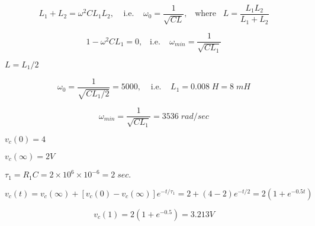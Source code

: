 {\newpage\clearpage
{}%
\begin{displaymath}	L_1+L_2=\omega^2CL_1L_2,\;\;\;\;\mbox{i.e.}\;\;\;\;
  	\omega_0=\frac{1}{\sqrt{CL}},\;\;\;\mbox{where}\;\;\;
  	L=\frac{L_1L_2}{L_1+L_2}
  \end{displaymath}%
\lthtmldisplayZ
\lthtmlcheckvsize\clearpage}

{\newpage\clearpage
{}%
\begin{displaymath}	1-\omega^2CL_1=0, \;\;\;\mbox{i.e.}\;\;\;\;
  	\omega_{min}=\frac{1}{\sqrt{CL_1}}	\end{displaymath}%
\lthtmldisplayZ
\lthtmlcheckvsize\clearpage}

{\newpage\clearpage
{}%
$L=L_1/2$%
\lthtmlinlinemathZ
\lthtmlcheckvsize\clearpage}

{\newpage\clearpage
{}%
\begin{displaymath} \omega_0=\frac{1}{\sqrt{CL_1/2}}=5000,\;\;\;\;\mbox{i.e.}\;\;\;\;
  	L_1=0.008\;H=8\;mH	\end{displaymath}%
\lthtmldisplayZ
\lthtmlcheckvsize\clearpage}

{\newpage\clearpage
{}%
\begin{displaymath} \omega_{min}=\frac{1}{\sqrt{CL_1}}=3536\;rad/sec	\end{displaymath}%
\lthtmldisplayZ
\lthtmlcheckvsize\clearpage}

{\newpage\clearpage
{}%
$v_c(0)=4$%
\lthtmlinlinemathZ
\lthtmlcheckvsize\clearpage}

{\newpage\clearpage
{}%
$v_c(\infty)=2V$%
\lthtmlinlinemathZ
\lthtmlcheckvsize\clearpage}

{\newpage\clearpage
{}%
$\tau_1=R_1C=2\times 10^6\times 10^{-6}=2\;sec.$%
\lthtmlinlinemathZ
\lthtmlcheckvsize\clearpage}

{\newpage\clearpage
{}%
\begin{displaymath} v_c(t)=v_c(\infty)+[v_c(0)-v_c(\infty)] e^{-t/\tau_1}
  	=2+(4-2) e^{-t/2}=2(1+e^{-0.5t})	\end{displaymath}%
\lthtmldisplayZ
\lthtmlcheckvsize\clearpage}

{\newpage\clearpage
{}%
\begin{displaymath} v_c(1)=2(1+e^{-0.5})=3.213V	\end{displaymath}%
\lthtmldisplayZ
\lthtmlcheckvsize\clearpage}

